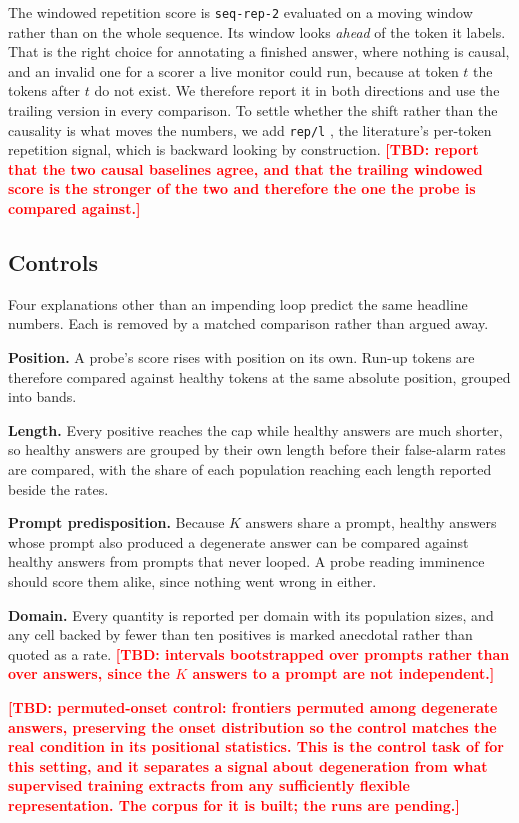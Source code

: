 \documentclass{article}
\newcommand{\TBD}[1]{\textcolor{red}{\textbf{[TBD: #1]}}}
\begin{document}
The windowed repetition score is \texttt{seq-rep-2} \citep{welleck2020neural}
evaluated on a moving window \citep{covington2010cutting} rather than on the whole
sequence. Its window looks \emph{ahead} of the token it labels. That is the right
choice for annotating a finished answer, where nothing is causal, and an invalid
one for a scorer a live monitor could run, because at token $t$ the tokens after
$t$ do not exist. We therefore report it in both directions and use the trailing
version in every comparison. To settle whether the shift rather than the
causality is what moves the numbers, we add \texttt{rep/l}
\citep{welleck2020neural}, the literature's per-token repetition signal, which is
backward looking by construction. \TBD{report that the two causal baselines
agree, and that the trailing windowed score is the stronger of the two and
therefore the one the probe is compared against.}

\subsection{Controls}
\label{sec:controls}
Four explanations other than an impending loop predict the same headline numbers.
Each is removed by a matched comparison rather than argued away.

\textbf{Position.} A probe's score rises with position on its own. Run-up tokens
are therefore compared against healthy tokens at the same absolute position,
grouped into bands.

\textbf{Length.} Every positive reaches the cap while healthy answers are much
shorter, so healthy answers are grouped by their own length before their
false-alarm rates are compared, with the share of each population reaching each
length reported beside the rates.

\textbf{Prompt predisposition.} Because $K$ answers share a prompt, healthy
answers whose prompt also produced a degenerate answer can be compared against
healthy answers from prompts that never looped. A probe reading imminence should
score them alike, since nothing went wrong in either.

\textbf{Domain.} Every quantity is reported per domain with its population sizes,
and any cell backed by fewer than ten positives is marked anecdotal rather than
quoted as a rate. \TBD{intervals bootstrapped over prompts rather than over
answers, since the $K$ answers to a prompt are not independent.}

\TBD{permuted-onset control: frontiers permuted among degenerate answers,
preserving the onset distribution so the control matches the real condition in
its positional statistics. This is the control task of \citet{hewitt2019designing}
for this setting, and it separates a signal about degeneration from what
supervised training extracts from any sufficiently flexible representation. The
corpus for it is built; the runs are pending.}
\end{document}
